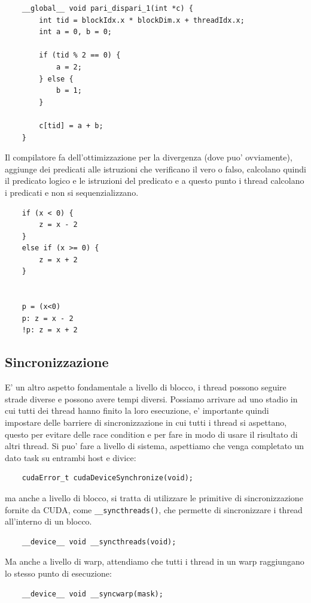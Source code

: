 \begin{lstlisting}
    __global__ void pari_dispari_1(int *c) {
        int tid = blockIdx.x * blockDim.x + threadIdx.x;
        int a = 0, b = 0;

        if (tid % 2 == 0) {
            a = 2;
        } else {
            b = 1;
        }

        c[tid] = a + b;
    }
\end{lstlisting}

Il compilatore fa dell'ottimizzazione per la divergenza (dove puo' ovviamente), aggiunge dei predicati alle istruzioni che verificano il vero o falso, calcolano quindi il predicato logico e le istruzioni del predicato e a questo punto i thread calcolano i predicati e non si sequenzializzano.

\begin{lstlisting}
    if (x < 0) {
        z = x - 2
    }
    else if (x >= 0) {
        z = x + 2
    }


    p = (x<0)
    p: z = x - 2
    !p: z = x + 2
\end{lstlisting}

\subsection{Sincronizzazione}
E' un altro aspetto fondamentale a livello di blocco, i thread possono seguire strade diverse e possono avere tempi diversi. Possiamo arrivare ad uno stadio in cui tutti dei thread hanno finito la loro esecuzione, e' importante quindi impostare delle barriere di sincronizzazione in cui tutti i thread si aspettano, questo per evitare delle race condition e per fare in modo di usare il risultato di altri thread.
Si puo' fare a livello di sistema, aspettiamo che venga completato un dato task su entrambi host e divice:
\begin{lstlisting}
    cudaError_t cudaDeviceSynchronize(void);
\end{lstlisting}

ma anche a livello di blocco, si tratta di utilizzare le primitive di sincronizzazione fornite da CUDA, come \texttt{\_\_syncthreads()}, che permette di sincronizzare i thread all'interno di un blocco.
\begin{lstlisting}
    __device__ void __syncthreads(void);
\end{lstlisting}

Ma anche a livello di warp, attendiamo che tutti i thread in un warp raggiungano lo stesso punto di esecuzione:
\begin{lstlisting}
    __device__ void __syncwarp(mask);
\end{lstlisting}

